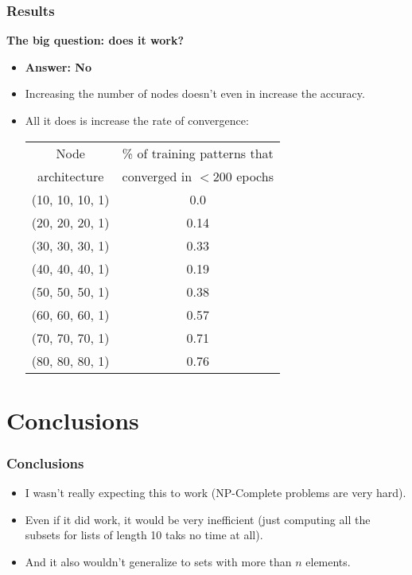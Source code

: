 \documentclass{beamer}
\numberwithin{equation}{section} %
\begin{document}
\begin{frame}
    \frametitle{Results}
    \textbf{The big question: does it work?}
    \begin{itemize}
        \item \textbf{Answer: No}
        \pause
        \item Increasing the number of nodes doesn't even in increase the accuracy.
        \pause
        \item All it does is increase the rate of convergence:\\
        \begin{tabular}{|c|c|}
            \hline
            Node & \% of training patterns that \\
            architecture & converged in $< 200$ epochs\\
            \hline
            (10, 10, 10, 1) & 0.0\\
            \hline
            (20, 20, 20, 1) & 0.14\\
            \hline
            (30, 30, 30, 1) & 0.33\\
            \hline
            (40, 40, 40, 1) & 0.19\\
            \hline
            (50, 50, 50, 1) & 0.38\\
            \hline
            (60, 60, 60, 1) & 0.57\\
            \hline
            (70, 70, 70, 1) & 0.71\\
            \hline
            (80, 80, 80, 1) & 0.76\\
            \hline
        \end{tabular}
    \end{itemize}
\end{frame}

\section{Conclusions}

\begin{frame}
    \frametitle{Conclusions}
    \begin{itemize}
        \item I wasn't really expecting this to work (NP-Complete problems are very hard).
        \pause
        \item Even if it did work, it would be very inefficient (just computing all the subsets for lists of length 10 taks no time at all).
        \pause
        \item And it also wouldn't generalize to sets with more than $n$ elements.
    \end{itemize}
\end{frame}
\end{document}
